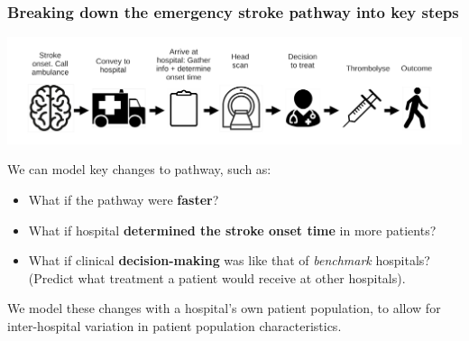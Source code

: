 \begin{frame}
\frametitle{Breaking down the emergency stroke pathway into key steps}
\begin{center}
\includegraphics[width=1.0\textwidth]{./images/pathway}
\end{center}
We can model key changes to pathway, such as:
\begin{small}
\begin{itemize}
    \item What if the pathway were \textbf{faster}?
    \item What if hospital \textbf{determined the stroke onset time} in more patients?
    \item What if clinical \textbf{decision-making} was like that of \emph{benchmark} hospitals? (Predict what treatment a patient would receive at other hospitals).
\end{itemize}
\end{small}
\footnotesize{We model these changes with a hospital's own patient population, to allow for inter-hospital variation in patient population characteristics.}
\end{frame}
